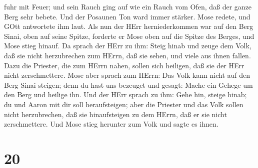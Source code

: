 fuhr mit Feuer; und sein Rauch ging auf wie ein Rauch vom Ofen, daß der
ganze Berg sehr bebete.  Und der Posaunen Ton ward immer
stärker. Mose redete, und GOtt antwortete ihm laut.  Als
nun der HErr herniederkommen war auf den Berg Sinai, oben auf seine
Spitze, forderte er Mose oben auf die Spitze des Berges, und Mose stieg
hinauf.  Da sprach der HErr zu ihm: Steig hinab und zeuge
dem Volk, daß sie nicht herzubrechen zum HErrn, daß sie sehen, und viele
aus ihnen fallen.  Dazu die Priester, die zum HErrn nahen,
sollen sich heiligen, daß sie der HErr nicht zerschmettere.
 Mose aber sprach zum HErrn: Das Volk kann nicht auf den
Berg Sinai steigen; denn du hast uns bezeuget und gesagt: Mache ein
Gehege um den Berg und heilige ihn.  Und der HErr sprach zu
ihm: Gehe hin, steige hinab; du und Aaron mit dir soll heraufsteigen;
aber die Priester und das Volk sollen nicht herzubrechen, daß sie
hinaufsteigen zu dem HErrn, daß er sie nicht zerschmettere.
 Und Mose stieg herunter zum Volk und sagte es ihnen.

\hypertarget{section-19}{%
\section{20}\label{section-19}}

